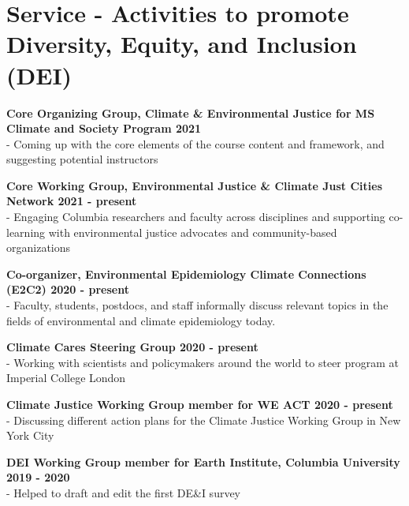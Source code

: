 \section*{Service - Activities to promote Diversity, Equity, and Inclusion (DEI)}

\noindent \textbf{Core Organizing Group, Climate \& Environmental Justice for MS Climate and Society Program \hfill 2021}\\
- Coming up with the core elements of the course content and framework, and suggesting potential instructors \medskip

\noindent \textbf{Core Working Group, Environmental Justice \& Climate Just Cities Network \hfill 2021 - present}\\
- Engaging Columbia researchers and faculty across disciplines and supporting co-learning with environmental justice advocates and community-based organizations \medskip

\noindent \textbf{Co-organizer, Environmental Epidemiology Climate Connections (E2C2) \hfill 2020 - present}\\
- Faculty, students, postdocs, and staff informally discuss relevant topics in the fields of environmental and climate epidemiology today. \medskip

\noindent \textbf{Climate Cares Steering Group \hfill 2020 - present}\\
- Working with scientists and policymakers around the world to steer program at Imperial College London \medskip

\noindent \textbf{Climate Justice Working Group member for WE ACT \hfill 2020 - present}\\
- Discussing different action plans for the Climate Justice Working Group in New York City \medskip

\noindent \textbf{DEI Working Group member for Earth Institute, Columbia University \hfill 2019 - 2020}\\
- Helped to draft and edit the first DE\&I survey \medskip




